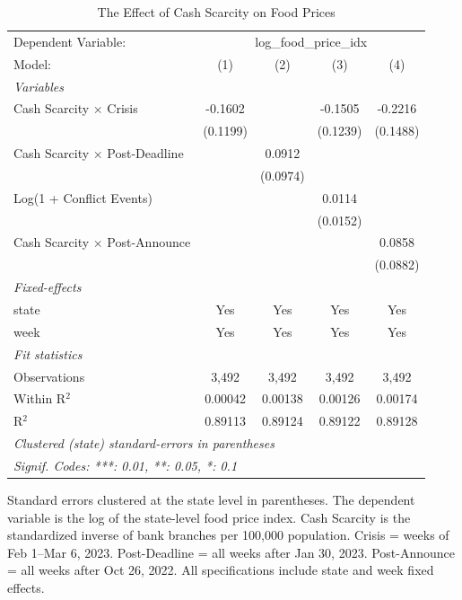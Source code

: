 
\begin{table}[htbp]
   \caption{The Effect of Cash Scarcity on Food Prices}
   \centering
   \begin{tabular}{lcccc}
      \tabularnewline \midrule \midrule
      Dependent Variable: & \multicolumn{4}{c}{log\_food\_price\_idx}\\
      Model:                                & (1)      & (2)      & (3)      & (4)\\  
      \midrule
      \emph{Variables}\\
      Cash Scarcity $\times$ Crisis         & -0.1602  &          & -0.1505  & -0.2216\\   
                                            & (0.1199) &          & (0.1239) & (0.1488)\\   
      Cash Scarcity $\times$ Post-Deadline  &          & 0.0912   &          &   \\   
                                            &          & (0.0974) &          &   \\   
      Log(1 + Conflict Events)              &          &          & 0.0114   &   \\   
                                            &          &          & (0.0152) &   \\   
      Cash Scarcity $\times$ Post-Announce  &          &          &          & 0.0858\\   
                                            &          &          &          & (0.0882)\\   
      \midrule
      \emph{Fixed-effects}\\
      state                                 & Yes      & Yes      & Yes      & Yes\\  
      week                                  & Yes      & Yes      & Yes      & Yes\\  
      \midrule
      \emph{Fit statistics}\\
      Observations                          & 3,492    & 3,492    & 3,492    & 3,492\\  
      Within R$^2$                          & 0.00042  & 0.00138  & 0.00126  & 0.00174\\  
      R$^2$                                 & 0.89113  & 0.89124  & 0.89122  & 0.89128\\  
      \midrule \midrule
      \multicolumn{5}{l}{\emph{Clustered (state) standard-errors in parentheses}}\\
      \multicolumn{5}{l}{\emph{Signif. Codes: ***: 0.01, **: 0.05, *: 0.1}}\\
   \end{tabular}
   
   \par \raggedright 
   Standard errors clustered at the state level in parentheses. The dependent variable is the log of the state-level food price index. Cash Scarcity is the standardized inverse of bank branches per 100,000 population. Crisis = weeks of Feb 1--Mar 6, 2023. Post-Deadline = all weeks after Jan 30, 2023. Post-Announce = all weeks after Oct 26, 2022. All specifications include state and week fixed effects.
\end{table}



